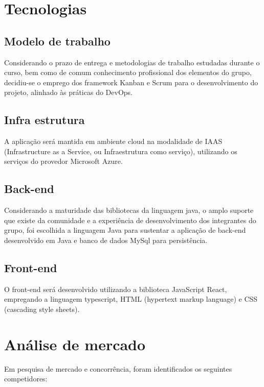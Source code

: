 \documentclass[
    12pt,               %
    openright,          %
    oneside,
    a4paper,            %
    MODELO,             %
    english,            %
    brazil              %
   ]{ifsp-spo-inf-ctds}
\begin{document}
\chapter[Tecnologias]{Tecnologias}

	\section{Modelo de trabalho}
	
	Considerando o prazo de entrega e metodologias de trabalho estudadas durante o curso, bem como de comum conhecimento profissional dos elementos do grupo, decidiu-se o emprego dos framework Kanban e Scrum para o desenvolvimento do projeto, alinhado {\`a}s práticas do DevOps.

	\section{Infra estrutura}
	
	A aplica{\c{c}}ão será mantida em ambiente cloud na modalidade de IAAS (Infrastructure as a Service, ou Infraestrutura como servi{\c{c}}o), utilizando os servi{\c{c}}os do provedor Microsoft Azure.
	
	\section{Back-end}
	
	Considerando a maturidade das bibliotecas da linguagem java, o amplo suporte que existe da comunidade e a experiência de desenvolvimento dos integrantes do grupo, foi escolhida a linguagem Java para sustentar a aplica{\c{c}}ão de back-end desenvolvido em Java e banco de dados MySql para persistência.
	
	\section{Front-end}
	
	O front-end será desenvolvido utilizando a biblioteca JavaScript React, empregando a linguagem typescript, HTML (hypertext markup language) e CSS (cascading style sheets).
	
\chapter[Análise de mercado]{Análise de mercado}

    Em pesquisa de mercado e concorrência, foram identificados os seguintes competidores:
    
\end{document}
